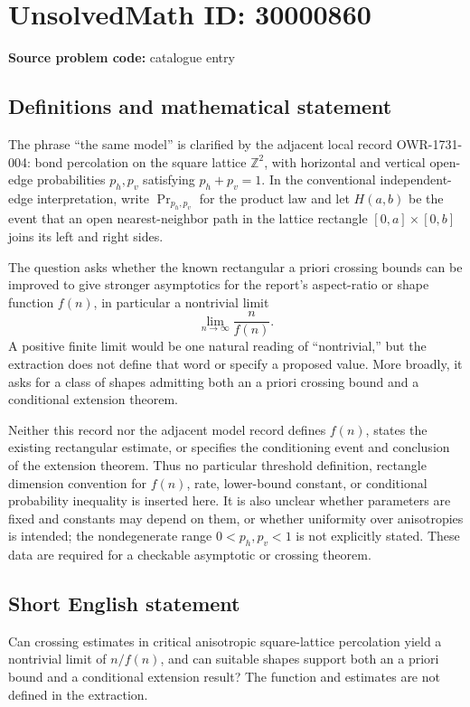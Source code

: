 \documentclass[11pt]{article}
\newcommand{\Z}{\mathbb{Z}}
\begin{document}
\section*{UnsolvedMath ID: 30000860}
\textbf{Source problem code:} catalogue entry
\subsection{Definitions and mathematical statement}
The phrase ``the same model'' is clarified by the adjacent local record OWR-1731-004: bond percolation on the square lattice \(\Z^2\), with horizontal and vertical open-edge probabilities \(p_h,p_v\) satisfying \(p_h+p_v=1\). In the conventional independent-edge interpretation, write \(\Pr_{p_h,p_v}\) for the product law and let \(H(a,b)\) be the event that an open nearest-neighbor path in the lattice rectangle \([0,a]\times[0,b]\) joins its left and right sides.

The question asks whether the known rectangular a priori crossing bounds can be improved to give stronger asymptotics for the report's aspect-ratio or shape function \(f(n)\), in particular a nontrivial limit
\[
\lim_{n\to\infty}\frac{n}{f(n)}.
\]
A positive finite limit would be one natural reading of ``nontrivial,'' but the extraction does not define that word or specify a proposed value. More broadly, it asks for a class of shapes admitting both an a priori crossing bound and a conditional extension theorem.

Neither this record nor the adjacent model record defines \(f(n)\), states the existing rectangular estimate, or specifies the conditioning event and conclusion of the extension theorem. Thus no particular threshold definition, rectangle dimension convention for \(f(n)\), rate, lower-bound constant, or conditional probability inequality is inserted here. It is also unclear whether parameters are fixed and constants may depend on them, or whether uniformity over anisotropies is intended; the nondegenerate range \(0<p_h,p_v<1\) is not explicitly stated. These data are required for a checkable asymptotic or crossing theorem.
\subsection{Short English statement}
Can crossing estimates in critical anisotropic square-lattice percolation yield a nontrivial limit of \(n/f(n)\), and can suitable shapes support both an a priori bound and a conditional extension result? The function and estimates are not defined in the extraction.
\end{document}
